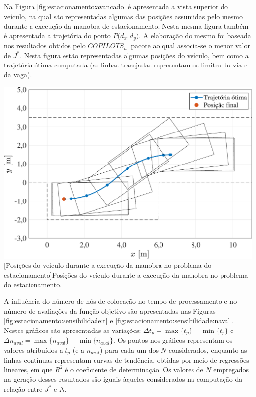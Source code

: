 
Na Figura \ref{fig:estacionamento:avancado} é apresentada a vista superior do veículo, na qual são representadas algumas das posições assumidas pelo mesmo durante a execução da manobra de estacionamento. Nesta mesma figura também é apresentada a trajetória do ponto $ P\big(d_x, d_y\big) $. A elaboração do mesmo foi baseada nos resultados obtidos pelo $ COPILOTS_h $, pacote ao qual associa-se o menor valor de $ J^* $. Nesta figura estão representadas algumas posições do veículo, bem como a trajetória ótima computada (as linhas tracejadas representam os limites da via e da vaga).  

\noindent
\begin{minipage}{\textwidth}
	\vspace{\onelineskip}
	\centering
	\includegraphics[scale=0.5]{fig/resultados/estacionamento/obs/adv}
	[Posições do veículo durante a execução da manobra no problema do estacionamento]{Posições do veículo durante a execução da manobra no problema do estacionamento.}
	\label{fig:estacionamento:avancado}
	\vspace{\onelineskip}
\end{minipage}


A influência do número de nós de colocação no tempo de processamento e no número de avaliações da função objetivo são apresentadas nas Figuras \ref{fig:estacionamento:sensibilidade:t} e \ref{fig:estacionamento:sensibilidade:naval}. Nestes gráficos são apresentadas as variações: $ \Delta t_p = \max\{t_p\} - \min\{t_p\} $ e $ \Delta n_{aval} = \max\{n_{aval}\} - \min\{n_{aval}\} $. Os pontos nos gráficos representam os valores atribuídos a $ t_p $ (e a $ n_{aval} $) para cada um dos $ N $ considerados, enquanto as linhas contínuas representam curvas de tendência, obtidas por meio de regressões lineares, em que $R^2$ é o coeficiente de determinação. Os valores de $ N $ empregados na geração desses resultados são iguais àqueles considerados na computação da relação entre $ J^* $ e $ N $. 


